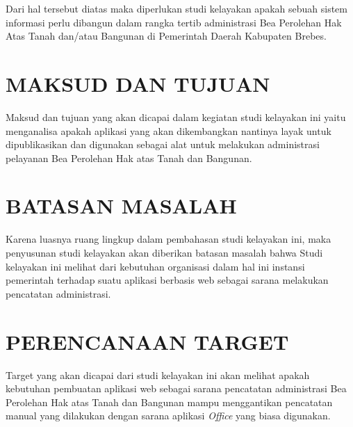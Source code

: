 \documentclass[pdftex,12pt, oneside]{article}
\begin{document}
Dari hal tersebut diatas maka diperlukan studi kelayakan apakah sebuah sistem informasi perlu dibangun dalam rangka tertib administrasi Bea Perolehan Hak Atas Tanah dan/atau Bangunan di Pemerintah Daerah Kabupaten Brebes.  

\section{MAKSUD DAN TUJUAN}

Maksud dan tujuan yang akan dicapai dalam kegiatan studi kelayakan ini yaitu menganalisa apakah aplikasi yang akan dikembangkan nantinya layak untuk dipublikasikan dan digunakan sebagai alat untuk melakukan administrasi pelayanan Bea Perolehan Hak atas Tanah dan Bangunan.

\section{BATASAN MASALAH}

Karena luasnya ruang lingkup dalam pembahasan studi kelayakan ini, maka penyusunan studi kelayakan akan diberikan batasan masalah bahwa Studi kelayakan ini melihat dari kebutuhan organisasi dalam hal ini instansi pemerintah terhadap suatu aplikasi berbasis web sebagai sarana melakukan pencatatan administrasi.

\section{PERENCANAAN TARGET}

Target yang akan dicapai dari studi kelayakan ini akan melihat apakah kebutuhan pembuatan aplikasi web sebagai sarana pencatatan administrasi Bea Perolehan Hak atas Tanah dan Bangunan mampu menggantikan pencatatan manual yang dilakukan dengan sarana aplikasi \textit{Office} yang biasa digunakan.
\end{document}
